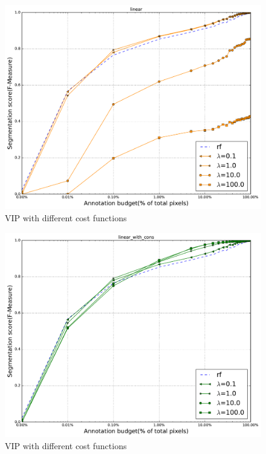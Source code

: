 \begin{figure}[h!] \label{fig:rf_vip2}
 \includegraphics[width=0.8\linewidth]{figures/linear.pdf} 
\caption{VIP with different cost functions}
\end{figure}

\begin{figure}[h!] \label{fig:rf_vip3}
 \includegraphics[width=0.8\linewidth]{figures/linear_with_cons.pdf}
\caption{VIP with different cost functions}
\end{figure}


